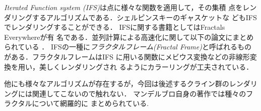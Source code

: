 {\it Iterated Function system (IFS)}は点に様々な関数を適用して，その集積
点をレンダリングするアルゴリズムである．シェルピンスキーのギャスケットな
どもIFSでレンダリングすることができる．
IFSに関する書籍としてはFractals Everywhere\cite{fractalsEverywhere}が有
名である．並列計算による高速化に関して以下の論文にまとめられている
\cite{highPerformanceIFS}\cite{GPUIFS}．
IFSの一種に\emph{フラクタルフレーム}{\it(Fractal
Frame)}\cite{fractalFrame}と呼ばれるものがある．フラクタルフレームはIFS
に用いる関数にメビウス変換などの非線形変換を用い，美しくレンダリングされ
るようにカラーリングが工夫されている．

他にも様々なアルゴリズムが存在するが，今回は後述するクライン群のレンダリ
ングには関連してこないので触れない．
マンデルブロ自身の著作\cite{fractal}では種々のフラクタルについて網羅的に
まとめられている.
